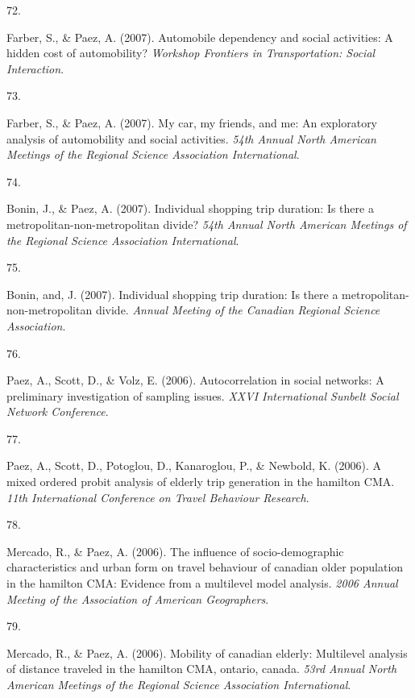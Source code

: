 \documentclass[10pt,a4paper,]{twentysecondcv}
\newlength{\csllabelwidth}
\newcommand{\CSLLeftMargin}[1]{\parbox[t]{\csllabelwidth}{#1}}
\newcommand{\CSLRightInline}[1]{\parbox[t]{\linewidth - \csllabelwidth}{#1}}
\begin{document}
\leavevmode{}%
\CSLLeftMargin{72. }%
\CSLRightInline{Farber, S., \& Paez, A. (2007). Automobile dependency
and social activities: A hidden cost of automobility? \emph{Workshop
Frontiers in Transportation: Social Interaction}.}

\leavevmode{}%
\CSLLeftMargin{73. }%
\CSLRightInline{Farber, S., \& Paez, A. (2007). My car, my friends, and
me: An exploratory analysis of automobility and social activities.
\emph{54th Annual North American Meetings of the Regional Science
Association International}.}

\leavevmode{}%
\CSLLeftMargin{74. }%
\CSLRightInline{Bonin, J., \& Paez, A. (2007). Individual shopping trip
duration: Is there a metropolitan-non-metropolitan divide? \emph{54th
Annual North American Meetings of the Regional Science Association
International}.}

\leavevmode{}%
\CSLLeftMargin{75. }%
\CSLRightInline{Bonin, and, J. (2007). Individual shopping trip
duration: Is there a metropolitan-non-metropolitan divide. \emph{Annual
Meeting of the Canadian Regional Science Association}.}

\leavevmode{}%
\CSLLeftMargin{76. }%
\CSLRightInline{Paez, A., Scott, D., \& Volz, E. (2006). Autocorrelation
in social networks: A preliminary investigation of sampling issues.
\emph{XXVI International Sunbelt Social Network Conference}.}

\leavevmode{}%
\CSLLeftMargin{77. }%
\CSLRightInline{Paez, A., Scott, D., Potoglou, D., Kanaroglou, P., \&
Newbold, K. (2006). A mixed ordered probit analysis of elderly trip
generation in the hamilton CMA. \emph{11th International Conference on
Travel Behaviour Research}.}

\leavevmode{}%
\CSLLeftMargin{78. }%
\CSLRightInline{Mercado, R., \& Paez, A. (2006). The influence of
socio-demographic characteristics and urban form on travel behaviour of
canadian older population in the hamilton CMA: Evidence from a
multilevel model analysis. \emph{2006 Annual Meeting of the Association
of American Geographers}.}

\leavevmode{}%
\CSLLeftMargin{79. }%
\CSLRightInline{Mercado, R., \& Paez, A. (2006). Mobility of canadian
elderly: Multilevel analysis of distance traveled in the hamilton CMA,
ontario, canada. \emph{53rd Annual North American Meetings of the
Regional Science Association International}.}
\end{document}
